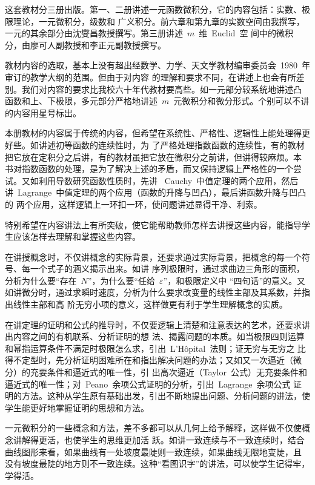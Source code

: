 
\begin{preface}
这套教材分三册出版。第一、二册讲述一元函数微积分，它的内容包括：实数、极限理论，一元微积分，级数和
广义积分。前六章和第九章的实数空间由我撰写，一元的其余部分由沈燮昌教授撰写。第三册讲述~$m$~维~Euclid~空
间中的微积分，由廖可人副教授和李正元副教授撰写。

教材内容的选取，基本上没有超出经数学、力学、天文学教材编审委员会~1980~年审订的教学大纲的范围。但由于对内容
的理解和要求不同，在讲述上也会有所差别。我们对内容的要求比我校六十年代教材要高些。如一元部分较系统地讲述凸
函数和上、下极限，多元部分严格地讲述~$m$~元微积分和微分形式。个别可以不讲的内容用星号标出。

本册教材的内容属于传统的内容，但希望在系统性、严格性、逻辑性上能处理得更好些。如讲述初等函数的连续性时，为
了严格处理指数函数的连续性，有的教材把它放在定积分之后讲，有的教材虽把它放在微积分之前讲，但讲得较麻烦。本
书对指数函数的处理，是为了解决上述的矛盾，而又保持逻辑上严格性的一个尝试。又如利用导数研究函数性质时，先讲
~Cauchy~中值定理的两个应用，然后讲~Lagrange~中值定理的两个应用（函数的升降与凹凸），最后讲函数升降与凹凸的
两个应用，这样逻辑上一环扣一环，使问题讲述显得干净、利索。

特别希望在内容讲法上有所突破，使它能帮助教师怎样去讲授这些内容，能指导学生应该怎样去理解和掌握这些内容。

在讲授概念时，不仅讲概念的实际背景，还要求通过实际背景，把概念的每一个符号、每一个式子的涵义揭示出来。如讲
序列极限时，通过求曲边三角形的面积，分析为什么要“存在~$N$”，为什么要“任给~$\varepsilon$”，和极限定义中
“四句话”的意义。又如讲微分时，通过求瞬时速度，分析为什么要求改变量的线性主部及其系数，并指出线性主部和高
阶无穷小项的意义，这样做更有利于学生理解概念的实质。

在讲定理的证明和公式的推导时，不仅要逻辑上清楚和注意表达的艺术，还要求讲出内容之间的有机联系、分析证明的想
法、揭露问题的本质。如当极限四则运算和幂指运算条件不满足时极限怎么求，引出~L'H\^opital~法则；证无穷与无穷之
比得不定型时，先分析证明困难所在和指出解决问题的办法；又如又一次逼近（微分）的充要条件和逼近式的唯一性，引
出高次逼近（Taylor~公式）无充要条件和逼近式的唯一性；对~Peano~余项公式证明的分析，引出~Lagrange~余项公式
证明的方法。这种从学生原有基础出发，引出不断地提出问题、分析问题的讲法，使学生能更好地掌握证明的思想和方法。

一元微积分的一些概念和方法，差不多都可以从几何上给予解释，这样做不仅使概念讲解得更活，也使学生的思维更加活
跃。如讲一致连续与不一致连续时，结合曲线图形来看，如果曲线有一处坡度最陡则一致连续，如果曲线无限地变陡，且
没有坡度最陡的地方则不一致连续。这种“看图识字”的讲法，可以使学生记得牢，学得活。


\end{preface}
